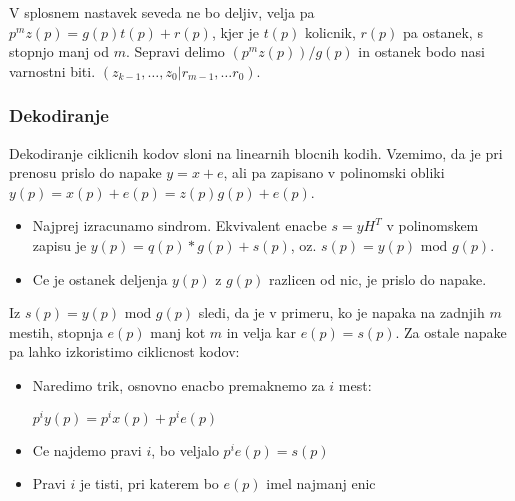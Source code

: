 \documentclass{article}
\begin{document}
\begin{multicols}{4}
	V splosnem nastavek seveda ne bo deljiv, velja pa $p^mz(p) = g(p)t(p) + r(p)$, kjer je $t(p)$ kolicnik,
	$r(p)$ pa ostanek, s stopnjo manj od $m$. Sepravi delimo $(p^m z(p)) / g(p)$ in ostanek bodo nasi varnostni biti.
	$(z_{k-1}, \dots, z_0 | r_{m-1}, \dots r_0)$.

	\subsubsection{Dekodiranje}
	Dekodiranje ciklicnih kodov sloni na linearnih blocnih kodih. Vzemimo, da je pri prenosu prislo do napake $y = x + e$, ali pa zapisano v polinomski
	obliki $y(p) = x(p) + e(p) = z(p)g(p) + e(p)$.
	\begin{itemize}
		\item Najprej izracunamo sindrom. Ekvivalent enacbe $s = yH^T$ v polinomskem zapisu je $y(p) = q(p)*g(p) + s(p)$, oz. $s(p) = y(p) \text{ mod } g(p)$.
		\item Ce je ostanek deljenja $y(p)$ z $g(p)$ razlicen od nic, je prislo do napake.
	\end{itemize}
	Iz $s(p) = y(p) \text{ mod } g(p)$ sledi, da je v primeru, ko je napaka na zadnjih $m$ mestih, stopnja $e(p)$ manj kot $m$ in velja kar $e(p) = s(p)$.
	Za ostale napake pa lahko izkoristimo ciklicnost kodov:
	\begin{itemize}
		\item Naredimo trik, osnovno enacbo premaknemo za $i$ mest:
		      \begin{center}
			      $p^iy(p) = p^ix(p) + p^i e(p)$
		      \end{center}
		\item Ce najdemo pravi $i$, bo veljalo $p^i e(p) = s(p)$
		\item Pravi $i$ je tisti, pri katerem bo $e(p)$ imel najmanj enic
	\end{itemize}


\end{multicols}
\end{document}
